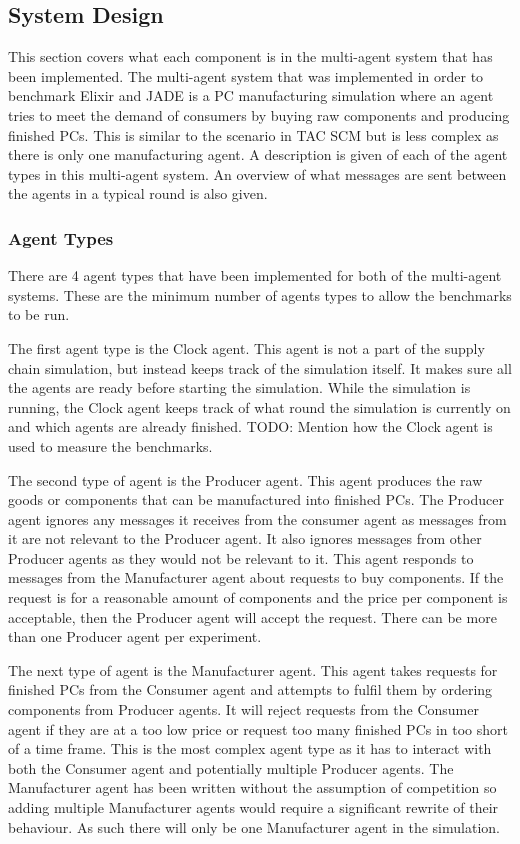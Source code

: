 \subsection{System Design}

This section covers what each component is in the multi-agent system that has been implemented.
The multi-agent system that was implemented in order to benchmark Elixir and JADE is a PC manufacturing simulation where an agent tries to meet the demand of consumers by buying raw components and producing finished PCs.
This is similar to the scenario in TAC SCM but is less complex as there is only one manufacturing agent.
A description is given of each of the agent types in this multi-agent system.
An overview of what messages are sent between the agents in a typical round is also given.

\subsubsection{Agent Types}

There are 4 agent types that have been implemented for both of the multi-agent systems.
These are the minimum number of agents types to allow the benchmarks to be run.

The first agent type is the Clock agent.
This agent is not a part of the supply chain simulation, but instead keeps track of the simulation itself.
It makes sure all the agents are ready before starting the simulation.
While the simulation is running, the Clock agent keeps track of what round the simulation is currently on and which agents are already finished.
TODO\@: Mention how the Clock agent is used to measure the benchmarks.

The second type of agent is the Producer agent.
This agent produces the raw goods or components that can be manufactured into finished PCs.
The Producer agent ignores any messages it receives from the consumer agent as messages from it are not relevant to the Producer agent.
It also ignores messages from other Producer agents as they would not be relevant to it.
This agent responds to messages from the Manufacturer agent about requests to buy components.
If the request is for a reasonable amount of components and the price per component is acceptable, then the Producer agent will accept the request.
There can be more than one Producer agent per experiment.

The next type of agent is the Manufacturer agent.
This agent takes requests for finished PCs from the Consumer agent and attempts to fulfil them by ordering components from Producer agents.
It will reject requests from the Consumer agent if they are at a too low price or request too many finished PCs in too short of a time frame.
This is the most complex agent type as it has to interact with both the Consumer agent and potentially multiple Producer agents.
The Manufacturer agent has been written without the assumption of competition so adding multiple Manufacturer agents would require a significant rewrite of their behaviour.
As such there will only be one Manufacturer agent in the simulation.

